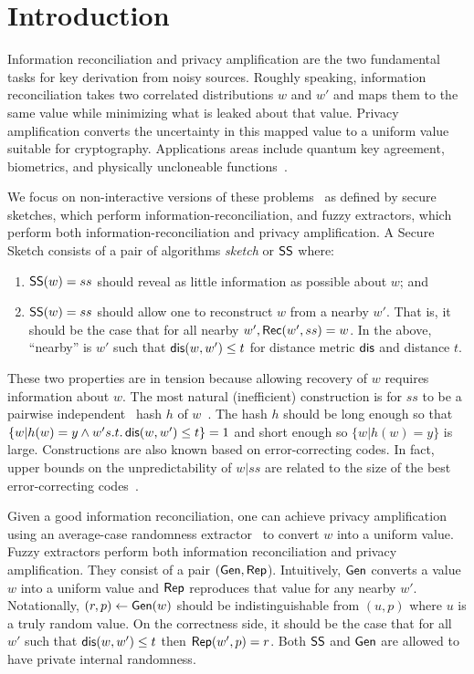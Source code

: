 
\section{Introduction}
Information reconciliation and privacy amplification are the two
fundamental tasks for key derivation from noisy sources.  Roughly
speaking, information reconciliation takes two correlated
distributions $w$ and $w'$ and maps them to the same value while
minimizing what is leaked about that value.  Privacy amplification
converts the uncertainty in this mapped value to a uniform value
suitable for cryptography.  Applications areas include quantum key
agreement, biometrics, and physically uncloneable
functions~\cite{bennett1988privacy,dodis2008fuzzy}.

We focus on non-interactive versions of these problems~\cite{dodis2008fuzzy} as defined by secure sketches, which perform information-recon\-ciliation, and fuzzy extractors, which perform both information-recon\-ciliation and privacy amplification. A Secure Sketch consists of a pair of algorithms \emph{sketch} or ${\mathsf{SS}}$ where:
\begin{enumerate}
\item ${\mathsf{SS}}(w) = ss$ should reveal as little information as possible about $w$; and
\item ${\mathsf{SS}}(w) =ss$ should allow one to reconstruct $w$ from a nearby $w'$. That is, it should be the case that for all nearby $w', {\mathsf{Rec}}(w', ss) = w$.  In the above, ``nearby'' is $w'$ such that $\mathsf{dis}(w,w')\le t$ for  distance metric $\mathsf{dis}$ and distance $t$.
\end{enumerate}
These two properties are in tension because allowing recovery of $w$ requires information about $w$.  The most natural (inefficient) construction is for $ss$ to be a pairwise independent~\cite{carter1977universal} hash $h$ of $w$~\cite{skoric2009efficient,fuller2016fuzzy,woodage2017new,fuller2020fuzzy}. The hash $h$ should be long enough so that $\{w | h(w) = y \wedge w' s.t.\,\mathsf{dis}(w, w')\le t\} =1$ and short enough so $\{w| h(w) = y\}$ is large. Constructions are also known based on error-correcting codes.  In fact, upper bounds on the unpredictability of $w | ss$ are related to the size of the best error-correcting codes~\cite{dodis2008fuzzy,fuller2020computational}. 

Given a good information reconciliation, one can achieve privacy amplification using an average-case randomness extractor~\cite{nisan1993randomness} to convert $w$ into a uniform value.
  Fuzzy extractors perform both information reconciliation and privacy amplification.  They consist of a pair $({\mathsf{Gen}}, {\mathsf{Rep}}$).  Intuitively, ${\mathsf{Gen}}$ converts a value $w$ into a uniform value and ${\mathsf{Rep}}$ reproduces that value for any nearby $w'$.  Notationally, $(r, p)\leftarrow {\ensuremath{\mathsf{Gen}}}(w)$ should be indistinguishable from $(u, p)$ where $u$ is a truly random value.  On the correctness side, it should be the case that for all $w'$ such that $\mathsf{dis}(w, w')\le t$ then ${\mathsf{Rep}}(w', p) =r$.  
  Both ${\mathsf{SS}}$ and ${\mathsf{Gen}}$ are allowed to have private internal randomness.  
  
